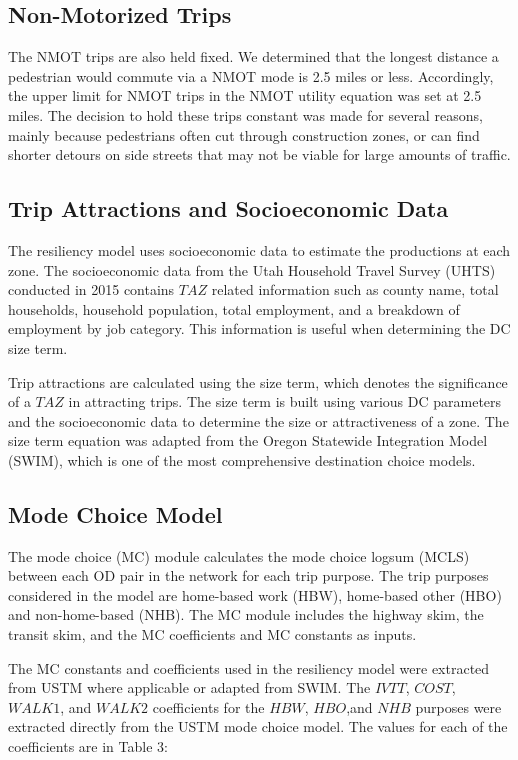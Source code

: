 \subsection{Non-Motorized Trips}

The NMOT trips are also held fixed. We determined that the longest distance a pedestrian would commute via a NMOT mode is 2.5 miles or less. Accordingly, the upper limit for NMOT trips in the NMOT utility equation was set at 2.5 miles. The decision to hold these trips constant was made for several reasons, mainly because pedestrians often cut through construction zones, or can find shorter detours on side streets that may not be viable for large amounts of traffic.

\subsection{Trip Attractions and Socioeconomic Data}

The resiliency model uses socioeconomic data to estimate the productions at
each zone. The socioeconomic data from the Utah Household Travel Survey (UHTS) conducted in 2015
contains $TAZ$ related information such as county name, total households, household population,
total employment, and a breakdown of employment by job category. This information is useful when
determining the DC size term.

Trip attractions are calculated using the size term, which denotes the significance of a $TAZ$ in
attracting trips. The size term is built using various DC parameters and the socioeconomic data
to determine the size or attractiveness of a zone. The size term equation was adapted from the
Oregon Statewide Integration Model (SWIM), which is one of the most comprehensive destination
choice models.

\subsection{Mode Choice Model}

The mode choice (MC) module calculates the mode choice logsum (MCLS) between each OD pair in the
network for each trip purpose. The trip purposes considered in the model are home-based work
(HBW), home-based other (HBO) and non-home-based (NHB). The MC module includes the highway skim,
the transit skim, and the MC coefficients and MC constants as inputs.

The MC constants and coefficients used in the resiliency model were extracted from USTM where
applicable or adapted from SWIM. The $IVTT$, $COST$, $WALK1$, and $WALK2$ coefficients for the
$HBW$, $HBO$,and $NHB$ purposes were extracted directly from the USTM mode choice model. The
values for each of the coefficients are in Table 3:

